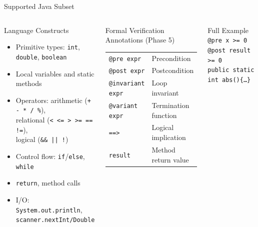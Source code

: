\documentclass[aspectratio=169,11pt]{beamer}
\begin{document}
\begin{frame}{Supported Java Subset}
\begin{columns}[t]
  \begin{block}{Language Constructs}
    \begin{itemize}\small
      \item Primitive types: \texttt{int}, \texttt{double}, \texttt{boolean}
      \item Local variables and static methods
      \item Operators: arithmetic (\texttt{+ - * / \%}),\\
            relational (\texttt{< <= > >= == !=}),\\
            logical (\texttt{\&\& || !})
      \item Control flow: \texttt{if}/\texttt{else}, \texttt{while}
      \item \texttt{return}, method calls
      \item I/O: \texttt{System.out.println}, \texttt{scanner.nextInt/Double}
    \end{itemize}
  \end{block}

  \begin{alertblock}{Formal Verification Annotations (Phase 5)}
    \begin{tabular}{ll}\small
      \texttt{@pre expr}       & Precondition\\
      \texttt{@post expr}      & Postcondition\\
      \texttt{@invariant expr} & Loop invariant\\
      \texttt{@variant expr}   & Termination function\\
      \texttt{==>}             & Logical implication\\
      \texttt{result}          & Method return value\\
    \end{tabular}
  \end{alertblock}
  \begin{exampleblock}{Full Example}
    \small
    \texttt{@pre\; x >= 0}\\
    \texttt{@post result >= 0}\\
    \texttt{public static int abs()\{\ldots\}}
  \end{exampleblock}
\end{columns}
\end{frame}
\end{document}
